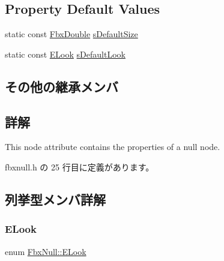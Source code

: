 \subsection*{Property Default Values}
\begin{DoxyCompactItemize}
\item 
static const \hyperlink{fbxtypes_8h_a171e72a1c46fc15c1a6c9c31948c1c5b}{Fbx\+Double} \hyperlink{class_fbx_null_a87d33c8990012bca2e52101ea02af9d5}{s\+Default\+Size}
\item 
static const \hyperlink{class_fbx_null_aa68cd0be1fca86a79ab603ee99505d78}{E\+Look} \hyperlink{class_fbx_null_a0945b3b81e8672f19f19445f593d6cca}{s\+Default\+Look}
\end{DoxyCompactItemize}
\subsection*{その他の継承メンバ}


\subsection{詳解}
This node attribute contains the properties of a null node. 

 fbxnull.\+h の 25 行目に定義があります。



\subsection{列挙型メンバ詳解}
\mbox{\label{class_fbx_null_aa68cd0be1fca86a79ab603ee99505d78}} 
\subsubsection{\texorpdfstring{E\+Look}{ELook}}
{\footnotesize\ttfamily enum \hyperlink{class_fbx_null_aa68cd0be1fca86a79ab603ee99505d78}{Fbx\+Null\+::\+E\+Look}}

